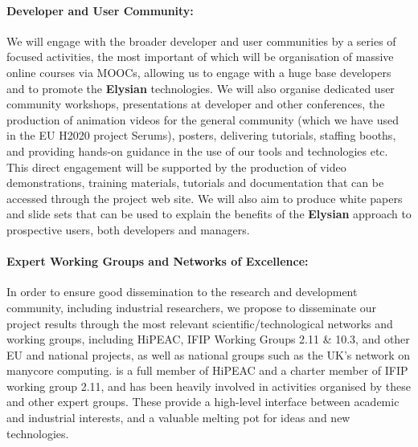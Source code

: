 \documentclass[a4paper,11pt]{article}
\newcommand{\project}[1]{\textbf{#1}\xspace}
\newcommand{\SECURITY}{\project{Elysian}}
\newcommand{\TheProject}{\SECURITY}
\begin{document}
\paragraph{Developer and User Community:} We will engage with the broader
developer and user communities by a series of focused activities, the most important of which will be organisation of massive online courses via MOOCs, allowing us to engage with a huge base developers and to promote the \TheProject{} technologies.
 We will also organise dedicated user community workshops, presentations at
 developer and other conferences, 
 the production of animation videos for the general community (which we have used in the EU H2020 project Serums), posters, delivering tutorials, staffing booths, and providing hands-on
 guidance in the use of our tools and technologies etc.  This direct engagement will be
 supported by the production of video demonstrations, training materials, tutorials and documentation that can
 be accessed through the project web site.  We will also aim to produce white papers and slide sets that
 can be used to explain the benefits of the \TheProject{} approach to prospective users, both developers
 and managers.

 \paragraph{Expert Working Groups and Networks of Excellence:}
In order to ensure good dissemination to the research and development
community, including industrial researchers, we propose to disseminate
our project results through the most relevant scientific/technological
networks and working groups, including HiPEAC, %
IFIP Working Groups 2.11 \& 10.3, and other EU and national projects,
as well as national groups such as the UK's network on manycore computing.
\SAshort{} is a full member of HiPEAC and a charter member of IFIP working
group 2.11, and has been heavily involved in activities organised by these and other expert groups.
These provide a high-level interface between academic and industrial interests, and a valuable
melting pot for ideas and new technologies. 
\end{document}
